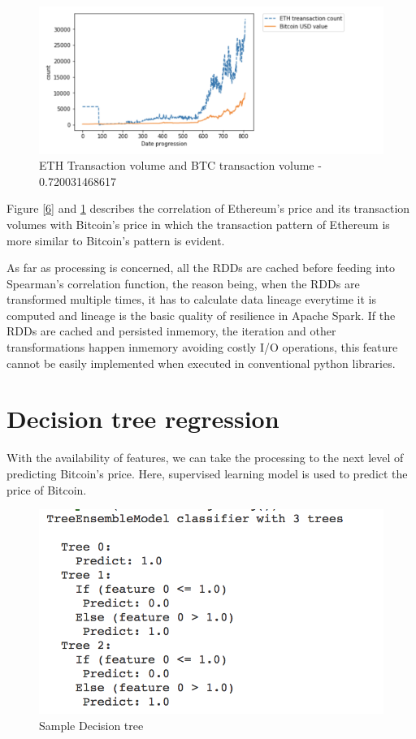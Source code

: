 \documentclass[sigconf]{acmart}
\begin{document}
\begin{figure}[!ht]
  \centering\includegraphics[width=\columnwidth]{PROJECT/images/ethtrancount.png}
  \caption{ETH Transaction volume and BTC transaction volume - 0.720031468617 }
  \label{7}
\end{figure}

Figure \ref{6} and \ref{7} describes the correlation of Ethereum's price and its transaction volumes with Bitcoin's price in which the transaction pattern of Ethereum is more similar to Bitcoin's pattern is evident. 

As far as processing is concerned, all the RDDs are cached before feeding into Spearman's correlation function, the reason being, when the RDDs are transformed multiple times, it has to calculate data lineage everytime it is computed and lineage is the basic quality of resilience in Apache Spark. If the RDDs are cached and persisted inmemory, the iteration and other transformations happen inmemory avoiding costly I/O operations, this feature cannot be easily implemented when executed in conventional python libraries.


\section{Decision tree regression}
With the availability of features, we can take the processing to the next level of predicting Bitcoin's price. Here, supervised learning model is used to predict the price of Bitcoin.

\begin{figure}[!ht]
  \centering\includegraphics[width=\columnwidth]{PROJECT/images/Decisiontree.png}
  \caption{Sample Decision tree}
  \label{fig:8decisiongree}
\end{figure}
 
\end{document}
